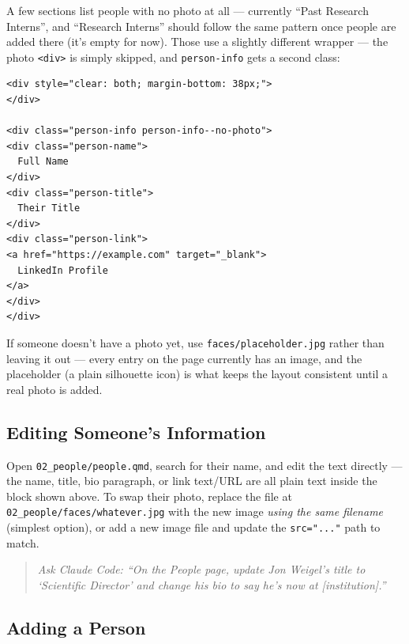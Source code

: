 \documentclass[11pt]{article}
\newcommand{\file}[1]{\texttt{#1}}
\begin{document}
A few sections list people with no photo at all --- currently ``Past
Research Interns'', and ``Research Interns'' should follow the same
pattern once people are added there (it's empty for now). Those use a
slightly different wrapper --- the photo \file{<div>} is simply
skipped, and \file{person-info} gets a second class:

\begin{lstlisting}
<div style="clear: both; margin-bottom: 38px;">
</div>

<div class="person-info person-info--no-photo">
<div class="person-name">
  Full Name
</div>
<div class="person-title">
  Their Title
</div>
<div class="person-link">
<a href="https://example.com" target="_blank">
  LinkedIn Profile
</a>
</div>
</div>
\end{lstlisting}

If someone doesn't have a photo yet, use
\file{faces/placeholder.jpg} rather than leaving it out --- every entry
on the page currently has an image, and the placeholder (a plain
silhouette icon) is what keeps the layout consistent until a real photo
is added.

\subsection{Editing Someone's Information}

Open \file{02\_people/people.qmd}, search for their name, and edit the
text directly --- the name, title, bio paragraph, or link text/URL are
all plain text inside the block shown above. To swap their photo,
replace the file at \file{02\_people/faces/whatever.jpg} with the new
image \emph{using the same filename} (simplest option), or add a new
image file and update the \file{src="..."} path to match.

\begin{quote}
\textit{Ask Claude Code: ``On the People page, update Jon Weigel's
title to `Scientific Director' and change his bio to say he's now at
[institution].''}
\end{quote}

\subsection{Adding a Person}
\end{document}
